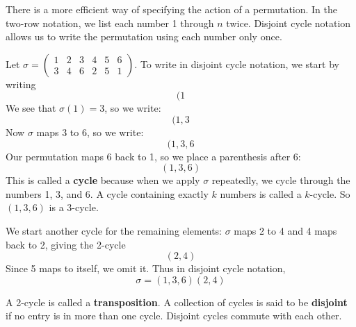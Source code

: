 There is a more efficient way of specifying the action of a permutation. In the two-row notation, we list each number 1 through $n$ twice. Disjoint cycle notation allows us to write the permutation using each number only once.

Let $\sigma = \begin{pmatrix} 1 & 2 & 3 & 4 & 5 & 6 \\ 3 & 4 & 6 & 2 & 5 & 1 \end{pmatrix}$. To write in disjoint cycle notation, we start by writing \[
    (1
\] We see that $\sigma(1) = 3$, so we write: \[
    (1, 3
\] Now $\sigma$ maps 3 to 6, so we write: \[
    (1, 3, 6
\] Our permutation maps 6 back to 1, so we place a parenthesis after 6: \[
    (1, 3, 6)
\]
This is called a \textbf{cycle} because when we apply $\sigma$ repeatedly, we cycle through the numbers 1, 3, and 6. A cycle containing exactly $k$ numbers is called a $k$-cycle. So $(1, 3, 6)$ is a 3-cycle.

We start another cycle for the remaining elements: $\sigma$ maps 2 to 4 and 4 maps back to 2, giving the 2-cycle \[
    (2, 4)
\] Since 5 maps to itself, we omit it. Thus in disjoint cycle notation, \[
    \sigma = (1, 3, 6)(2, 4)
\]

A 2-cycle is called a \textbf{transposition}. A collection of cycles is said to be \textbf{disjoint} if no entry is in more than one cycle. Disjoint cycles commute with each other.




